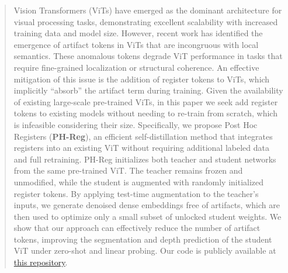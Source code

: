 \begin{abstract}
Vision Transformers (ViTs) have emerged as the dominant architecture for visual processing tasks, demonstrating excellent scalability with increased training data and model size. However, recent work has identified the emergence of artifact tokens in ViTs that are incongruous with local semantics. These anomalous tokens degrade ViT performance in tasks that require fine-grained localization or structural coherence. 
An effective mitigation of this issue is the addition of register tokens to ViTs, which implicitly ``absorb'' the artifact term during training. Given the availability of existing large-scale pre-trained ViTs, in this paper we seek add register tokens to existing models without needing to re-train from scratch, which is infeasible considering their size. Specifically, we propose Post Hoc Registers (\textbf{PH-Reg}), an efficient self-distillation method that integrates registers into an existing ViT without requiring additional labeled data and full retraining. PH-Reg initializes both teacher and student networks from the same pre-trained ViT. The teacher remains frozen and unmodified, while the student is augmented with randomly initialized register tokens. By applying test-time augmentation to the teacher's inputs, we generate denoised dense embeddings free of artifacts, which are then used to optimize only a small subset of unlocked student weights. We show that our approach can effectively reduce the number of artifact tokens, improving the segmentation and depth prediction of the student ViT under zero-shot and linear probing. Our code is publicly available at \href{https://github.com/0raiser0/PH-Reg}{this repository}.
\end{abstract}
